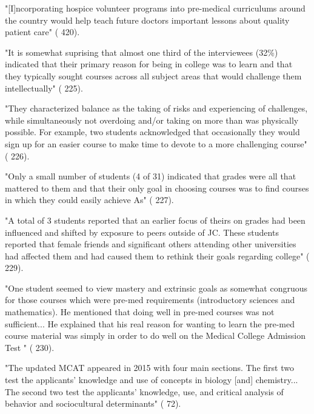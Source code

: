 "[I]ncorporating hospice volunteer programs into pre-medical curriculums around the country would help teach future doctors important lessons about quality patient care" (\cite{Doering-2015} 420).




"It is somewhat suprising that almost one third of the interviewees (32\%) indicated that their primary reason for being in college was to learn and that they typically sought courses across all subject areas that would challenge them intellectually" (\cite{Horowitz-2010} 225).

"They characterized balance as the taking of risks and experiencing of challenges, while simultaneously not overdoing and/or taking on more than was physically possible. For example, two students acknowledged that occasionally they would sign up for an easier course to make time to devote to a more challenging course" (\cite{Horowitz-2010} 226).


"Only a small number of students (4 of 31) indicated that grades were all that mattered to them and that their only goal in choosing courses was to find courses in which they could easily achieve As" (\cite{Horowitz-2010} 227).

"A total of 3 students reported that an earlier focus of theirs on grades had been influenced and shifted by exposure to peers outside of JC. These students reported that female friends and significant others attending other universities had affected them and had caused them to rethink their goals regarding college" (\cite{Horowitz-2010} 229).

"One student seemed to view mastery and extrinsic goals as somewhat congruous for those courses which were pre-med requirements (introductory sciences and mathematics). He mentioned that doing well in pre-med courses was not sufficient... He explained that his real reason for wanting to learn the pre-med course material was simply in order to do well on the Medical College Admission Test " (\cite{Horowitz-2010} 230).




"The updated MCAT appeared in 2015 with four main sections. The first two test the applicants' knowledge and use of concepts in biology [and] chemistry... The second two test the applicants' knowledge, use, and critical analysis of behavior and sociocultural determinants" (\cite{Olsen-2016} 72).

